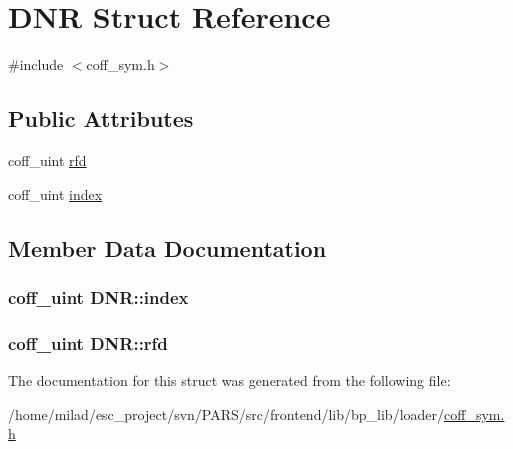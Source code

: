 \hypertarget{structDNR}{
\section{DNR Struct Reference}
\label{structDNR}
}


{\ttfamily \#include $<$coff\_\-sym.h$>$}

\subsection*{Public Attributes}
\begin{DoxyCompactItemize}
\item 
coff\_\-uint \hyperlink{structDNR_aeffcb89576f85b501a13890ca05cef37}{rfd}
\item 
coff\_\-uint \hyperlink{structDNR_a114ef57a8fe90f1981752f9c938fef46}{index}
\end{DoxyCompactItemize}


\subsection{Member Data Documentation}
\hypertarget{structDNR_a114ef57a8fe90f1981752f9c938fef46}{
\subsubsection[{index}]{\setlength{\rightskip}{0pt plus 5cm}coff\_\-uint {\bf DNR::index}}}
\label{structDNR_a114ef57a8fe90f1981752f9c938fef46}
\hypertarget{structDNR_aeffcb89576f85b501a13890ca05cef37}{
\subsubsection[{rfd}]{\setlength{\rightskip}{0pt plus 5cm}coff\_\-uint {\bf DNR::rfd}}}
\label{structDNR_aeffcb89576f85b501a13890ca05cef37}


The documentation for this struct was generated from the following file:\begin{DoxyCompactItemize}
\item 
/home/milad/esc\_\-project/svn/PARS/src/frontend/lib/bp\_\-lib/loader/\hyperlink{coff__sym_8h}{coff\_\-sym.h}\end{DoxyCompactItemize}
